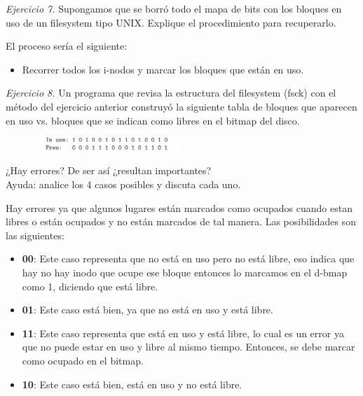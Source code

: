 \documentclass[12pt]{article}
\begin{document}
\noindent \textit{Ejercicio 7.} Supongamos que se borró todo el mapa de bits con los bloques en uso de un filesystem tipo UNIX. Explique el procedimiento para recuperarlo.


\begin{rta}
    El proceso sería el siguiente:
    \begin{itemize}
        \item Recorrer todos los i-nodos y marcar los bloques que están en uso.
    \end{itemize}
\end{rta}

\noindent \textit{Ejercicio 8.} Un programa que revisa la estructura del filesystem (fsck) con el método del ejercicio anterior construyó la siguiente tabla de bloques que aparecen en uso vs. bloques que se indican como libres en el bitmap del disco.  

\begin{figure}[h]
    \centering
    \includegraphics[width=0.5\textwidth]{d1.png}
\end{figure}

¿Hay errores? De ser así ¿resultan importantes?\\
Ayuda: analice los 4 casos posibles y discuta cada uno.


\begin{rta}
    Hay errores ya que algunos lugares están marcados como ocupados cuando estan libres o están ocupados y no están marcados de tal manera. Las posibilidades son las siguientes:
    \begin{itemize}
        \item \textbf{00}: Este caso representa que no está en uso pero no está libre, eso indica que hay no hay inodo que ocupe ese bloque entonces lo marcamos en el d-bmap como 1, diciendo que está libre.
        \item \textbf{01}: Este caso está bien, ya que no está en uso y está libre.	
        \item \textbf{11}: Este caso representa que está en uso y está libre, lo cual es un error ya que no puede estar en uso y libre al mismo tiempo. Entonces, se debe marcar como ocupado en el bitmap.
        \item \textbf{10}: Este caso está bien, está en uso y no está libre.
    \end{itemize}
\end{rta}
\end{document}
